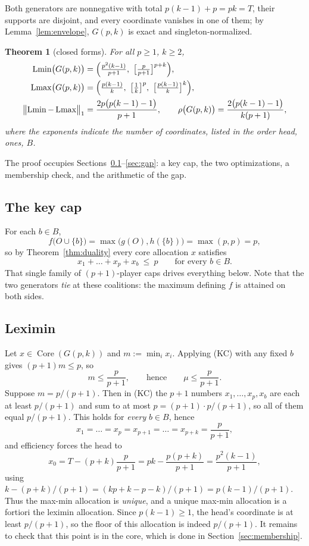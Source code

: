 \documentclass[11pt]{article}
\newtheorem{theorem}{Theorem}
\newcommand{\core}{\operatorname{Core}}
\newcommand{\Lmin}{\operatorname{Lmin}}
\newcommand{\Lmax}{\operatorname{Lmax}}
\begin{document}
Both generators are nonnegative with total $p(k-1)+p=pk=T$, their supports
are disjoint, and every coordinate vanishes in one of them; by
Lemma~\ref{lem:envelope}, $G(p,k)$ is exact and singleton-normalized.

\begin{theorem}[closed forms]\label{thm:family}
For all $p\ge1$, $k\ge2$,
\begin{align*}
 \Lmin\bigl(G(p,k)\bigr)&=\Bigl(\tfrac{p^2(k-1)}{p+1},\ \bigl[\tfrac{p}{p+1}\bigr]^{p+k}\Bigr),\\
 \Lmax\bigl(G(p,k)\bigr)&=\Bigl(\tfrac{p(k-1)}{k},\ \bigl[\tfrac1k\bigr]^{p},\ \bigl[\tfrac{p(k-1)}{k}\bigr]^{k}\Bigr),\\
 \bigl\|\Lmin-\Lmax\bigr\|_1&=\frac{2p\bigl(p(k-1)-1\bigr)}{p+1},
 \qquad
 \rho\bigl(G(p,k)\bigr)=\frac{2\bigl(p(k-1)-1\bigr)}{k(p+1)},
\end{align*}
where the exponents indicate the number of coordinates, listed in the order
head, ones, $B$.
\end{theorem}

The proof occupies Sections~\ref{sec:keycap}--\ref{sec:gap}: a key cap, the
two optimizations, a membership check, and the arithmetic of the gap.

\subsection{The key cap}\label{sec:keycap}

For each $b\in B$,
\[
 f\bigl(O\cup\{b\}\bigr)=\max\bigl(g(O),h(\{b\})\bigr)=\max(p,p)=p,
\]
so by Theorem~\ref{thm:duality} every core allocation $x$ satisfies
\[
 x_1+\dots+x_p+x_b\ \le\ p\qquad\text{for every }b\in B. \tag{KC}
\]
That single family of $(p+1)$-player caps drives everything below.  Note that
the two generators \emph{tie} at these coalitions: the maximum defining $f$
is attained on both sides.

\subsection{Leximin}

Let $x\in\core(G(p,k))$ and $m:=\min_ix_i$.  Applying (KC) with any fixed $b$
gives $(p+1)m\le p$, so
\[
 m\le\frac{p}{p+1},\qquad\text{hence}\qquad \mu\le\frac{p}{p+1}.
\]
Suppose $m=p/(p+1)$.  Then in (KC) the $p+1$ numbers $x_1,\dots,x_p,x_b$ are
each at least $p/(p+1)$ and sum to at most $p=(p+1)\cdot p/(p+1)$, so all of
them equal $p/(p+1)$.  This holds for \emph{every} $b\in B$, hence
\[
 x_1=\dots=x_p=x_{p+1}=\dots=x_{p+k}=\frac{p}{p+1},
\]
and efficiency forces the head to
\[
 x_0=T-(p+k)\frac{p}{p+1}=pk-\frac{p(p+k)}{p+1}=\frac{p^2(k-1)}{p+1},
\]
using $k-(p+k)/(p+1)=(kp+k-p-k)/(p+1)=p(k-1)/(p+1)$.  Thus the max-min
allocation is \emph{unique}, and a unique max-min allocation is a fortiori
the leximin allocation.  Since $p(k-1)\ge1$, the head's coordinate is at
least $p/(p+1)$, so the floor of this allocation is indeed $p/(p+1)$.  It
remains to check that this point is in the core, which is done in
Section~\ref{sec:membership}.
\end{document}
